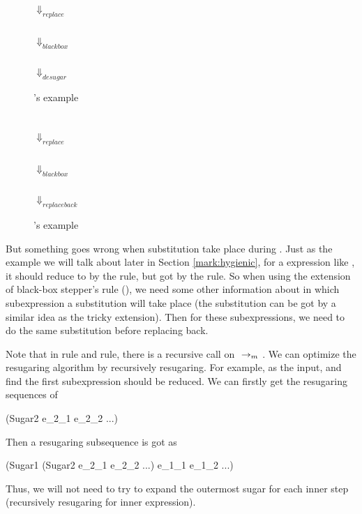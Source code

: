 \begin{center}
\begin{figure}[thb]
\centering
{}\\ $\Downarrow_{replace}$\\ \\ $\Downarrow_{blackbox}$\\ \\ $\Downarrow_{desugar}$\\ 
\caption{'s example}
\label{fig:e1}
\end{figure}

\begin{figure}[thb]
\centering
{}\\ $\Downarrow_{replace}$ \\\\ $\Downarrow_{blackbox}$\\  \\ $\Downarrow_{replaceback}$\\ 
\caption{'s example}
\label{fig:e2}
\end{figure}


\end{center}

But something goes wrong when substitution take place during . Just as the example we will talk about later in Section \ref{mark:hygienic}, for a expression like , it should reduce to  by the  rule, but got  by the  rule. So when using the extension of black-box stepper's rule (), we need some other information about in which subexpression a substitution will take place (the substitution can be got by a similar idea as the tricky extension). Then for these subexpressions, we need to do the same substitution before replacing back. 


\label{mark:optimize}
Note that in  rule and  rule, there is a recursive call on $~\rightarrow_m~$. We can optimize the resugaring algorithm by recursively resugaring. For example,  as the input, and find the first subexpression should be reduced. We can firstly get the resugaring sequences of  
\begin{Codes}
    (Sugar2 e_2_1 e_2_2 ...)
 
\end{Codes}
Then a resugaring subsequence is got as
\begin{Codes}
    (Sugar1 (Sugar2 e_2_1 e_2_2 ...) e_1_1 e_1_2 ...)
 
\end{Codes}
Thus, we will not need to try to expand the outermost sugar for each inner step (recursively resugaring for inner expression).

